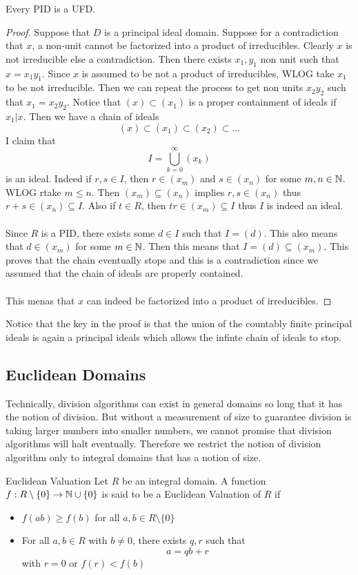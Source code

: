 \documentclass[a4paper]{article}
\begin{document}
\begin{prp}{}{} Every PID is a UFD. \tcbline
\begin{proof}
Suppose that $D$ is a principal ideal domain. Suppose for a contradiction that $x$, a non-unit cannot be factorized into a product of irreducibles. Clearly $x$ is not irreducible else a contradiction. Then there exists $x_1,y_1$ non unit such that $x=x_1y_1$. Since $x$ is assumed to be not a product of irreducibles, WLOG take $x_1$ to be not irreducible. Then we can repeat the process to get non units $x_2y_2$ such that $x_1=x_2y_2$. Notice that $(x)\subset(x_1)$ is a proper containment of ideals if $x_1|x$. Then we have a chain of ideals $$(x)\subset(x_1)\subset(x_2)\subset\dots$$ I claim that $$I=\bigcup_{k=0}^\infty(x_k)$$ is an ideal. Indeed if $r,s\in I$, then $r\in(x_m)$ and $s\in(x_n)$ for some $m,n\in\mathbb{N}$. WLOG rtake $m\leq n$. Then $(x_m)\subseteq(x_n)$ implies $r,s\in(x_n)$ thus $r+s\in(x_n)\subseteq I$. Also if $t\in R$, then $tr\in(x_m)\subseteq I$ thus $I$ is indeed an ideal. \\~\\
Since $R$ is a PID, there exists some $d\in I$ such that $I=(d)$. This also means that $d\in(x_m)$ for some $m\in\mathbb{N}$. Then this means that $I=(d)\subseteq(x_m)$. This proves that the chain eventually stops and this is a contradiction since we assumed that the chain of ideals are properly contained. \\~\\
This menas that $x$ can indeed be factorized into a product of irreducibles. 
\end{proof}
\end{prp}

Notice that the key in the proof is that the union of the countably finite principal ideals is again a principal ideals which allows the infinte chain of ideals to stop. 

\subsection{Euclidean Domains}
Technically, division algorithms can exist in general domains so long that it has the notion of division. But without a measurement of size to guarantee division is taking larger numbers into smaller numbers, we cannot promise that division algorithms will halt eventually. Therefore we restrict the notion of division algorithm only to integral domains that has a notion of size. 
\begin{defn}{Euclidean Valuation}{} Let $R$ be an integral domain. A function $f:R\setminus\{0\}\to\mathbb{N}\cup\{0\}$ is said to be a Euclidean Valuation of $R$ if
\begin{itemize}
\item $f(ab)\geq f(b)$ for all $a,b\in R\setminus\{0\}$
\item For all $a,b\in R$ with $b\neq0$, there exists $q,r$ such that $$a=qb+r$$ with $r=0$ or $f(r)<f(b)$
\end{itemize}
\end{defn}
\end{document}
